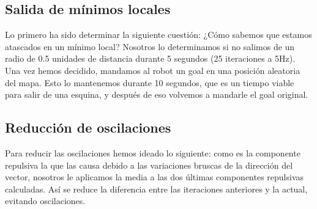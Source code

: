 \documentclass[a4paper, 11pt, titlepage]{article}
\begin{document}
  \subsection{Salida de mínimos locales}
    Lo primero ha sido determinar la siguiente cuestión: ¿Cómo sabemos que estamos atascados en un mínimo local? Nosotros lo determinamos si no salimos de un radio de 0.5 unidades de distancia durante 5 segundos (25 iteraciones a 5Hz). Una vez hemos decidido, mandamos al robot un goal en una posición aleatoria del mapa. Esto lo mantenemos durante 10 segundos, que es un tiempo viable para salir de una esquina, y después de eso volvemos a mandarle el goal original.

  \subsection{Reducción de oscilaciones}
    Para reducir las oscilaciones hemos ideado lo siguiente: como es la componente repulsiva la que las causa debido a las variaciones bruscas de la dirección del vector, nosotros le aplicamos la media a las dos últimas componentes repulsivas calculadas. Así se reduce la diferencia entre las iteraciones anteriores y la actual, evitando oscilaciones.
\end{document}
